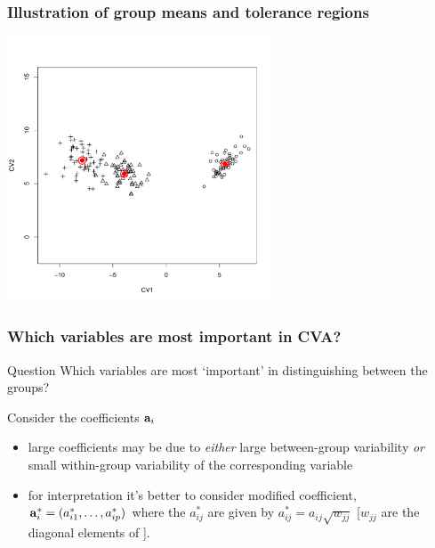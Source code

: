 \documentclass{beamer}
\begin{document}
\begin{frame}
  \frametitle{Illustration of group means and tolerance regions}

\begin{center}
\includegraphics[height=3.1in]{iris-CVA-meantol}
\end{center}

\end{frame}


\begin{frame}
  \frametitle{Which variables are most important in CVA?}

\begin{block}{Question}
Which variables are most `important' in distinguishing between the groups?
\end{block}

Consider the coefficients $\mathbf{a}_i$
\begin{itemize}
\item large coefficients may be due to \emph{either} large between-group variability \emph{or} small within-group variability of the corresponding variable
\item for interpretation it's better to consider modified coefficient, $\mathbf{a}_{i}^{*} = (a_{i1}^{*},\ldots,a_{ip}^{*})$ where the $a_{ij}^{*}$ are given by $a_{ij}^{*} = a_{ij}\sqrt{w_{jj}}$ [$w_{jj}$ are the diagonal elements of ].
\end{itemize}

\end{frame}


% 
% 
\end{document}
